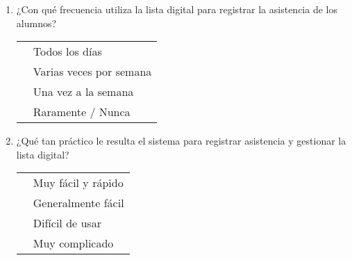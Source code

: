 \documentclass[12pt, a4paper]{article}
\newcommand{\checkbox}{\fbox{\rule{0pt}{1.5ex}\rule{1.5ex}{0pt}}}
\begin{document}
                                                                                                                        \begin{enumerate}[label=\textbf{B\arabic*}.]
                                                                                                                        \item ¿Con qué frecuencia utiliza la lista digital para registrar la asistencia de los alumnos?\\
                                                                                                                            \begin{tabular}{ll}
                                                                                                                            \checkbox & Todos los días \\
                                                                                                                                \checkbox & Varias veces por semana \\
                                                                                                                                \checkbox & Una vez a la semana \\
                                                                                                                                \checkbox & Raramente / Nunca \\
                                                                                                                                \end{tabular}

                                                                                                                                \item ¿Qué tan práctico le resulta el sistema para registrar asistencia y gestionar la lista digital?\\
                                                                                                                                    \begin{tabular}{ll}
                                                                                                                                    \checkbox & Muy fácil y rápido \\
                                                                                                                                        \checkbox & Generalmente fácil \\
                                                                                                                                        \checkbox & Difícil de usar \\
                                                                                                                                        \checkbox & Muy complicado \\
                                                                                                                                        \end{tabular}


\end{enumerate}
\end{document}
